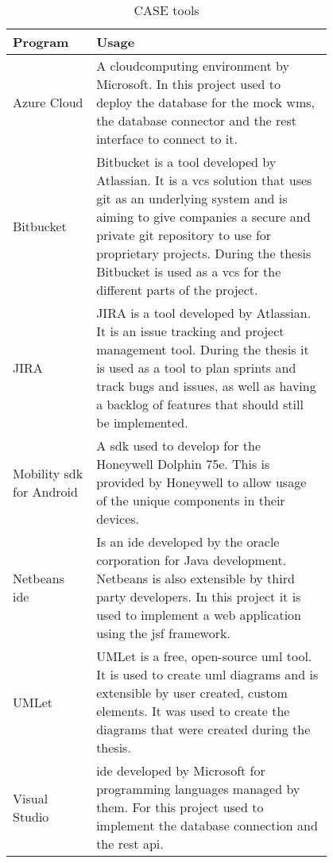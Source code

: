 \begin{table}[htbp]
	\begin{center}
	\begin{tabular}{|p{0.2\linewidth}|p{0.6\linewidth}|} \hline
	\textbf{Program} & \textbf{Usage} \\ \hline
	Azure Cloud & A \gls{cloudcomputing} environment by Microsoft. In this project used to deploy the database for the mock \gls{wms}, the database connector and the \gls{rest} interface to connect to it. \\ \hline
	Bitbucket & Bitbucket is a tool developed by Atlassian. It is a \gls{vcs} solution that uses git as an underlying system and is aiming to give companies a secure and private git repository to use for proprietary projects. During the thesis Bitbucket is used as a \gls{vcs} for the different parts of the project. \\ \hline
	JIRA & JIRA is a tool developed by Atlassian. It is an issue tracking and project management tool. During the thesis it is used as a tool to plan sprints and track bugs and issues, as well as having a backlog of features that should still be implemented. \\ \hline
	Mobility \gls{sdk} for Android & A \gls{sdk} used to develop for the Honeywell Dolphin 75e. This is provided by Honeywell to allow usage of the unique components in their devices.\\ \hline
	Netbeans \gls{ide} & Is an \gls{ide} developed by the oracle corporation for Java development. Netbeans is also extensible by third party developers. In this project it is used to implement a web application using the \gls{jsf} framework.  \\ \hline
	UMLet & UMLet is a free, open-source \gls{uml} tool. It is used to create \gls{uml} diagrams and is extensible by user created, custom elements. \citep{website:umlet} It was used to create the diagrams that were created during the thesis.  \\ \hline
	Visual Studio & \gls{ide} developed by Microsoft for programming languages managed by them. For this project used to implement the database connection and the \gls{rest} \gls{api}. \\ \hline
	\end{tabular}
	\end{center}
	\caption{CASE tools}\label{tab:case}
\end{table}